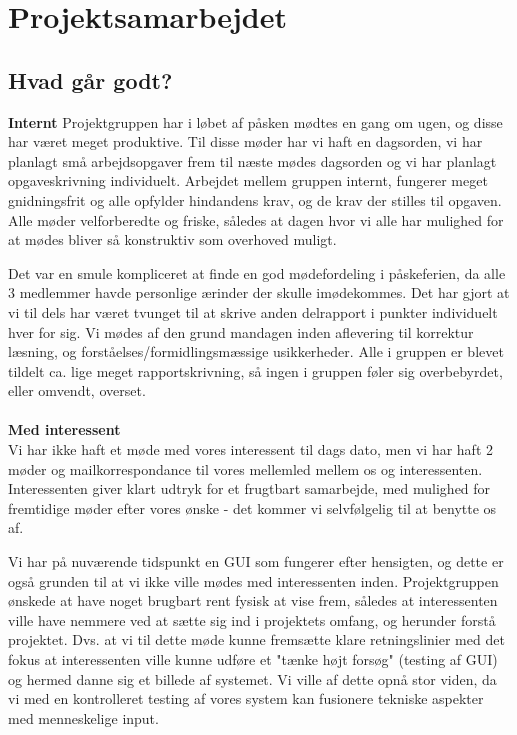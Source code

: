 \documentclass[a4paper,12pt]{article}
\begin{document}
\section{Projektsamarbejdet}
\subsection{Hvad går godt?}

\textbf{Internt}
\newline
Projektgruppen har i løbet af påsken mødtes en gang om ugen, og disse har været meget produktive. Til disse møder har vi haft en dagsorden, vi har planlagt små arbejdsopgaver frem til næste mødes dagsorden og vi har planlagt opgaveskrivning individuelt. Arbejdet mellem gruppen internt, fungerer meget gnidningsfrit og alle opfylder hindandens krav, og de krav der stilles til opgaven. Alle møder velforberedte og friske, således at dagen hvor vi alle har mulighed for at mødes bliver så konstruktiv som overhoved muligt.

Det var en smule kompliceret at finde en god mødefordeling i påskeferien, da alle 3 medlemmer havde personlige ærinder der skulle imødekommes. Det har gjort at vi til dels har været tvunget til at skrive anden delrapport i punkter individuelt hver for sig. Vi mødes af den grund mandagen inden aflevering til korrektur læsning, og forståelses/formidlingsmæssige usikkerheder. Alle i gruppen er blevet tildelt ca. lige meget rapportskrivning, så ingen i gruppen føler sig overbebyrdet, eller omvendt, overset. 
\\
\\
\textbf{Med interessent}
\\
Vi har ikke haft et møde med vores interessent til dags dato, men vi har haft 2 møder og mailkorrespondance til vores mellemled mellem os og interessenten. Interessenten giver klart udtryk for et frugtbart samarbejde, med mulighed for fremtidige møder efter vores ønske - det kommer vi selvfølgelig til at benytte os 
af.

Vi har på nuværende tidspunkt en GUI som fungerer efter hensigten, og dette er også grunden til at vi ikke ville mødes med interessenten inden. Projektgruppen ønskede at have noget brugbart rent fysisk at vise frem, således at interessenten ville have nemmere ved at sætte sig ind i projektets omfang, og herunder forstå projektet. Dvs. at vi til dette møde kunne fremsætte klare retningslinier med det fokus at interessenten ville kunne udføre et "tænke højt forsøg" (testing af GUI) og hermed danne sig et billede af systemet. Vi ville af dette opnå stor viden, da vi med en kontrolleret testing af vores system kan fusionere tekniske aspekter med menneskelige input.
\end{document}
